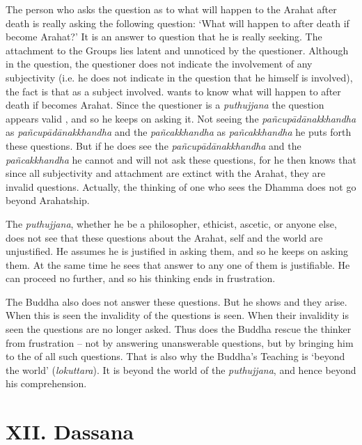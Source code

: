 The person who asks the question as to what will happen to the Arahat after death is really asking the following question: `What will happen to  after death if  become Arahat?' It is an answer to  question that he is really seeking. The attachment to the Groups lies latent and unnoticed by the questioner. Although in the question, the questioner does not indicate the involvement of any subjectivity (i.e. he does not indicate in the question that he himself is involved), the fact is that  as a subject  involved.  wants to know what will happen to  after death if  becomes Arahat. Since the questioner is a \emph{puthujjana} the question appears valid , and so he keeps on asking it. Not seeing the \emph{pañcupādānakkhandha} as \emph{pañcupādānakkhandha} and the \emph{pañcakkhandha} as \emph{pañcakkhandha} he puts forth these questions. But if he does see the \emph{pañcupādānakkhandha} and the \emph{pañcakkhandha} he cannot and will not ask these questions, for he then knows that since all subjectivity and attachment are extinct with the Arahat, they are invalid questions. Actually, the thinking of one who sees the Dhamma does not go beyond Arahatship.

The \emph{puthujjana}, whether he be a philosopher, ethicist, ascetic, or anyone else, does not see that these questions about the Arahat, self and the world are unjustified. He assumes he is justified in asking them, and so he keeps on asking them. At the same time he sees that  answer to any one of them is justifiable. He can proceed no further, and so his thinking ends in frustration.

The Buddha also does not answer these questions. But he shows  and  they arise. When this is seen the invalidity of the questions is seen. When their invalidity is seen the questions are no longer asked. Thus does the Buddha rescue the thinker from frustration -- not by answering unanswerable questions, but by bringing him to the  of all such questions. That is also why the Buddha's Teaching is `beyond the world' (\emph{lokuttara}). It is beyond the world of the \emph{puthujjana}, and hence beyond his comprehension.

\hypertarget{_xii_dassana}{%
\section{XII. Dassana}\label{_xii_dassana}}

